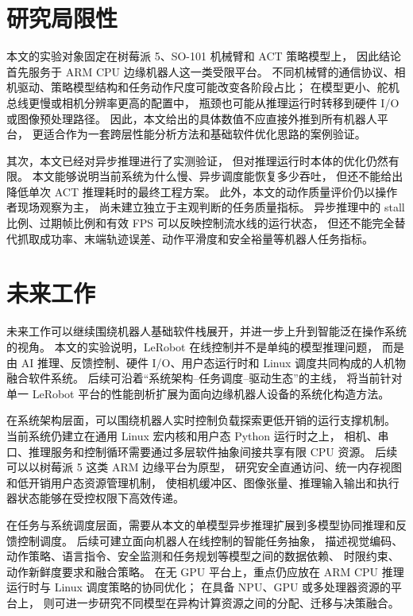 \begin{conclusion}
\section{研究局限性}

本文的实验对象固定在树莓派 5、SO-101 机械臂和 ACT 策略模型上，
因此结论首先服务于 ARM CPU 边缘机器人这一类受限平台。
不同机械臂的通信协议、相机驱动、策略模型结构和任务动作尺度可能改变各阶段占比；
在模型更小、舵机总线更慢或相机分辨率更高的配置中，
瓶颈也可能从推理运行时转移到硬件 I/O 或图像预处理路径。
因此，本文给出的具体数值不应直接外推到所有机器人平台，
更适合作为一套跨层性能分析方法和基础软件优化思路的案例验证。

其次，本文已经对异步推理进行了实测验证，
但对推理运行时本体的优化仍然有限。
本文能够说明当前系统为什么慢、异步调度能恢复多少吞吐，
但还不能给出降低单次 ACT 推理耗时的最终工程方案。
此外，本文的动作质量评价仍以操作者现场观察为主，
尚未建立独立于主观判断的任务质量指标。
异步推理中的 stall 比例、过期帧比例和有效 FPS 可以反映控制流水线的运行状态，
但还不能完全替代抓取成功率、末端轨迹误差、动作平滑度和安全裕量等机器人任务指标。

\section{未来工作}

未来工作可以继续围绕机器人基础软件栈展开，并进一步上升到智能泛在操作系统的视角。
本文的实验说明，LeRobot 在线控制并不是单纯的模型推理问题，
而是由 AI 推理、反馈控制、硬件 I/O、用户态运行时和 Linux 调度共同构成的人机物融合软件系统。
后续可沿着“系统架构--任务调度--驱动生态”的主线，
将当前针对单一 LeRobot 平台的性能剖析扩展为面向边缘机器人设备的系统化构造方法。

在系统架构层面，可以围绕机器人实时控制负载探索更低开销的运行支撑机制。
当前系统仍建立在通用 Linux 宏内核和用户态 Python 运行时之上，
相机、串口、推理服务和控制循环需要通过多层软件抽象间接共享有限 CPU 资源。
后续可以以树莓派 5 这类 ARM 边缘平台为原型，
研究安全直通访问、统一内存视图和低开销用户态资源管理机制，
使相机缓冲区、图像张量、推理输入输出和执行器状态能够在受控权限下高效传递。

在任务与系统调度层面，需要从本文的单模型异步推理扩展到多模型协同推理和反馈控制调度。
后续可建立面向机器人在线控制的智能任务抽象，
描述视觉编码、动作策略、语言指令、安全监测和任务规划等模型之间的数据依赖、
时限约束、动作新鲜度要求和融合策略。
在无 GPU 平台上，重点仍应放在 ARM CPU 推理运行时与 Linux 调度策略的协同优化；
在具备 NPU、GPU 或多处理器资源的平台上，
则可进一步研究不同模型在异构计算资源之间的分配、迁移与决策融合。


\end{conclusion}
